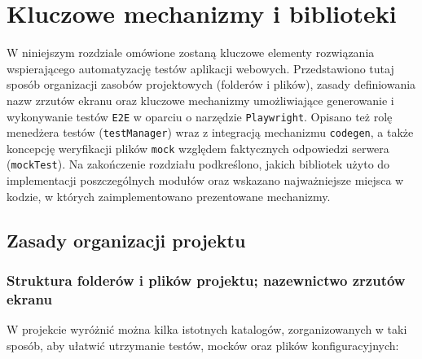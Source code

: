 \documentclass[12pt]{report}
\begin{document}
\chapter{Kluczowe mechanizmy i biblioteki}
\label{chap:kluczowe-mechanizmy}

W niniejszym rozdziale omówione zostaną kluczowe elementy rozwiązania wspierającego automatyzację testów aplikacji webowych. Przedstawiono tutaj sposób organizacji zasobów projektowych (folderów i plików), zasady definiowania nazw zrzutów ekranu oraz kluczowe mechanizmy umożliwiające generowanie i wykonywanie testów \texttt{E2E} w oparciu o narzędzie \texttt{Playwright}. Opisano też rolę menedżera testów (\texttt{testManager}) wraz z integracją mechanizmu \texttt{codegen}, a także koncepcję weryfikacji plików \texttt{mock} względem faktycznych odpowiedzi serwera (\texttt{mockTest}). Na zakończenie rozdziału podkreślono, jakich bibliotek użyto do implementacji poszczególnych modułów oraz wskazano najważniejsze miejsca w kodzie, w których zaimplementowano prezentowane mechanizmy.

\section{Zasady organizacji projektu}
\label{sec:zasady-organizacji}

\subsection{Struktura folderów i plików projektu; nazewnictwo zrzutów ekranu}
\label{sec:struktura-folderow}

W projekcie wyróżnić można kilka istotnych katalogów, zorganizowanych w taki sposób, aby ułatwić utrzymanie testów, mocków oraz plików konfiguracyjnych:
\end{document}
